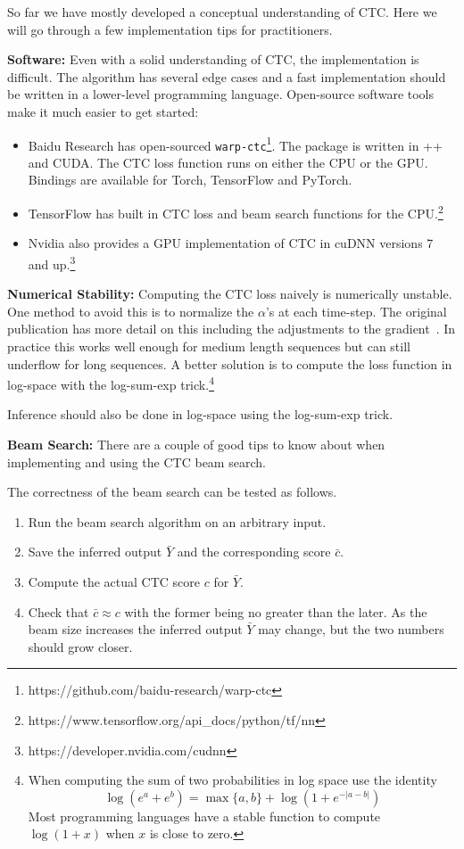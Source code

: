 So far we have mostly developed a conceptual understanding of CTC. Here we will
go through a few implementation tips for practitioners.

{\bf Software:} Even with a solid understanding of CTC, the implementation is
difficult. The algorithm has several edge cases and a fast implementation
should be written in a lower-level programming language.  Open-source software
tools make it much easier to get started:

\begin{itemize}
\item Baidu Research has open-sourced
    \texttt{warp-ctc}\footnote{https://github.com/baidu-research/warp-ctc}. The
    package is written in \C++ and CUDA. The CTC loss function runs on
    either the CPU or the GPU. Bindings are available for Torch, TensorFlow
    and PyTorch.
\item TensorFlow has built in CTC loss and beam search functions for the
    CPU.\footnote{https://www.tensorflow.org/api\_docs/python/tf/nn}
\item Nvidia also provides a GPU implementation of CTC in cuDNN versions 7 and
    up.\footnote{https://developer.nvidia.com/cudnn}
\end{itemize}

{\bf Numerical Stability:} Computing the CTC loss naively is numerically
unstable. One method to avoid this is to normalize the $\alpha$’s at each
time-step. The original publication has more detail on this including the
adjustments to the gradient~\cite{graves2006}. In practice this works well
enough for medium length sequences but can still underflow for long sequences.
A better solution is to compute the loss function in log-space with the
log-sum-exp trick.\footnote{When computing the sum of two probabilities in log
space use the identity
\[
\log(e^a + e^b) = \max\{a, b\} + \log(1 + e^{-|a-b|})
\]
Most programming languages have a stable function to compute $\log(1 + x)$ when
$x$ is close to zero.}

Inference should also be done in log-space using the log-sum-exp trick.

{\bf Beam Search:} There are a couple of good tips to know about when
implementing and using the CTC beam search.

The correctness of the beam search can be tested as follows.
\begin{enumerate}
\item Run the beam search algorithm on an arbitrary input.
\item Save the inferred output $\bar{Y}$ and the corresponding score $\bar{c}$.
\item Compute the actual CTC score $c$ for $\bar{Y}$.
\item Check that $\bar{c} \approx c$ with the former being no greater than the
      later. As the beam size increases the inferred output $\bar{Y}$ may change,
      but the two numbers should grow closer.
\end{enumerate}


